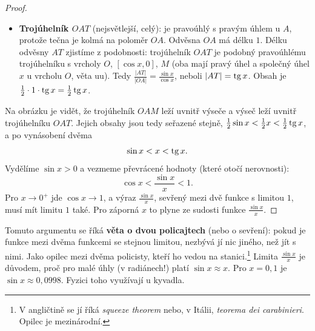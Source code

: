 \begin{proof}
\begin{itemize}
    \item \textbf{Trojúhelník $OAT$} (nejsvětlejší, celý): je pravoúhlý s pravým úhlem u $A$, protože tečna je kolmá na poloměr $OA$. Odvěsna $OA$ má délku $1$. Délku odvěsny $AT$ zjistíme z podobnosti: trojúhelník $OAT$ je podobný pravoúhlému trojúhelníku s vrcholy $O$, $[\cos x, 0]$, $M$ (oba mají pravý úhel a společný úhel $x$ u vrcholu $O$, věta uu). Tedy $\frac{|AT|}{|OA|} = \frac{\sin x}{\cos x}$, neboli $|AT| = \operatorname{tg} x$. Obsah je $\frac{1}{2}\cdot 1\cdot\operatorname{tg} x = \frac{1}{2}\operatorname{tg} x$.
  \end{itemize}
  Na obrázku je vidět, že trojúhelník $OAM$ leží uvnitř výseče a výseč leží uvnitř trojúhelníku $OAT$. Jejich obsahy jsou tedy seřazené stejně, $\frac{1}{2}\sin x < \frac{1}{2}x < \frac{1}{2}\operatorname{tg} x$, a po vynásobení dvěma
  \begin{equation*}
    \sin x < x < \operatorname{tg} x.
  \end{equation*}
  Vydělíme $\sin x > 0$ a vezmeme převrácené hodnoty (které otočí nerovnosti):
  \begin{equation*}
    \cos x < \frac{\sin x}{x} < 1.
  \end{equation*}
  Pro $x\to 0^+$ jde $\cos x\to 1$, a výraz $\frac{\sin x}{x}$, sevřený mezi dvě funkce s limitou $1$, musí mít limitu $1$ také. Pro záporná $x$ to plyne ze sudosti funkce $\frac{\sin x}{x}$.
\end{proof}

Tomuto argumentu se říká \textbf{věta o dvou policajtech} (nebo o sevření): pokud je funkce mezi dvěma funkcemi se stejnou limitou, nezbývá jí nic jiného, než jít s nimi. Jako opilec mezi dvěma policisty, kteří ho vedou na stanici.\footnote{V angličtině se jí říká \textit{squeeze theorem} nebo, v Itálii, \textit{teorema dei carabinieri}. Opilec je mezinárodní.} Limita $\frac{\sin x}{x}$ je důvodem, proč pro malé úhly (v radiánech!) platí $\sin x\approx x$. Pro $x = 0{,}1$ je $\sin x\approx 0{,}0998$. Fyzici toho využívají u kyvadla.

